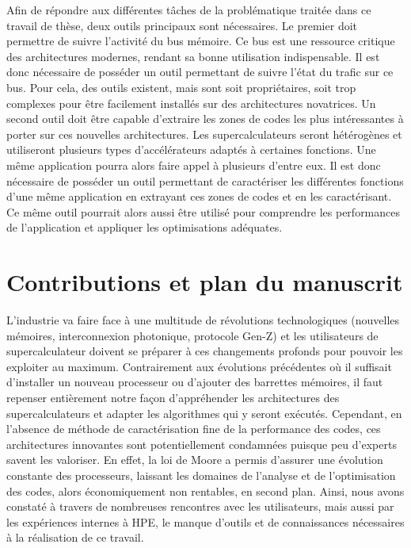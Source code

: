             Afin de répondre aux différentes tâches de la problématique traitée dans ce travail de thèse, deux outils principaux sont nécessaires. 
            Le premier doit permettre de suivre l'activité du bus mémoire. Ce bus est une ressource critique des architectures modernes, rendant sa bonne utilisation indispensable. Il est donc nécessaire de posséder un outil permettant de suivre l'état du trafic sur ce bus. Pour cela, des outils existent, mais sont soit propriétaires, soit trop complexes pour être facilement installés sur des architectures novatrices. 
            Un second outil doit être capable d'extraire les zones de codes les plus intéressantes à porter sur ces nouvelles architectures. Les supercalculateurs seront hétérogènes et utiliseront plusieurs types d'accélérateurs adaptés à certaines fonctions. Une même application pourra alors faire appel à plusieurs d'entre eux. Il est donc nécessaire de posséder un outil permettant de caractériser les différentes fonctions d'une même application en extrayant ces zones de codes et en les caractérisant.  Ce même outil pourrait alors aussi être utilisé pour comprendre les performances de l'application et appliquer les optimisations adéquates. 

\section{Contributions et plan du manuscrit}
    
    L'industrie va faire face à une multitude de révolutions technologiques (nouvelles mémoires, interconnexion photonique, protocole Gen-Z) et les utilisateurs de supercalculateur doivent se préparer à ces changements profonds pour pouvoir les exploiter au maximum. Contrairement aux évolutions précédentes où il suffisait d'installer un nouveau processeur ou d'ajouter des barrettes mémoires, il faut repenser entièrement notre façon d'appréhender les architectures des supercalculateurs et adapter les algorithmes qui y seront exécutés. Cependant, en l'absence de méthode de caractérisation fine de la performance des codes, ces architectures innovantes sont potentiellement condamnées puisque peu d'experts savent les valoriser. En effet, la loi de Moore a permis d'assurer une évolution constante des processeurs, laissant les domaines de l'analyse et de l'optimisation des codes, alors économiquement non rentables, en second plan. Ainsi, nous avons constaté à travers de nombreuses rencontres avec les utilisateurs, mais aussi par les expériences internes à HPE, le manque d'outils et de connaissances nécessaires à la réalisation de ce travail.
    

